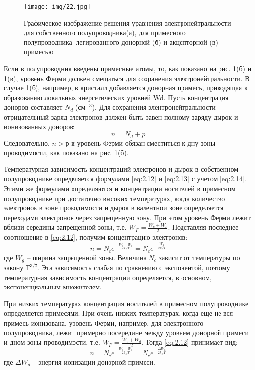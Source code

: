 \begin{figure}[h!]
	\texttt{[image: img/22.jpg]}
	\caption{Графическое изображение решения уравнения электронейтральности для собственного полупроводника(а), для примесного полупроводника, легированного донорной (б) и акцепторной (в) примесью}
	\label{fig:2.1}
\end{figure}

Если в полупроводник введены примесные атомы, то, как показано на рис. \ref{fig:2.1}(б) и \ref{fig:2.1}(в), уровень Ферми должен смещаться для
сохранения электронейтральности. В случае \ref{fig:2.1}(б), например, в кристалл добавляется донорная примесь, приводящая к
образованию локальных энергетических уровней Wd. Пусть концентрация доноров составляет $N_d$ (см$^{-3}$). Для сохранения
элентронейтральности отрицательный заряд электронов должен быть равен полному заряду дырок и ионизованных доноров:
\begin{equation}
	n = N_d+p
	\label{eq:2.15}
\end{equation}
Следовательно, $n>р$ и уровень Ферми обязан сместиться к дну зоны проводимости, как показано на рис. \ref{fig:2.1}(б).

Температурная зависимость концентраций электронов и дырок в собственном полупроводнике определяется формулами \eqref{eq:2.12} и \eqref{eq:2.13} с учетом
\eqref{eq:2.14}. Этими же формулами определяются и концентрации носителей в примесном полупроводнике при достаточно высоких
температурах, когда количество электронов в зоне проводимости и дырок в валентной зоне определяется переходами
электронов через запрещенную зону. При этом уровень Ферми лежит вблизи середины запрещенной зоны, т.е. $W_F =
\frac{W_c+W_{\nu}}{2}$. Подставляя последнее соотношение в \eqref{eq:2.12}, получим концентрацию электронов:
\begin{equation}
	n=N_{c} e^{-\frac{W_{c}-W_{v}}{2 k_{B} T}}=N_{c} e^{-\frac{W_{g}}{2 k_{B} T}}
	\label{eq:2.16}
\end{equation}
где $W_g$  – ширина запрещенной зоны. Величина $N_c$ зависит от температуры по закону $Т^{3/2}$. Эта зависимость слабая по
сравнению с экспонентой, поэтому температурная зависимость концентрации определяется, в основном, экспоненциальным
множителем. 

При низких температурах концентрация носителей в примесном полупроводнике определяется примесями. При очень низких
температурах, когда еще не вся примесь ионизована, уровень Ферми, например, для электронного полупроводника, лежит
примерно посередине между уровнем донорной примеси и дном зоны проводимости, т.е. $W_F = \frac{W_c+W_{d}}{2}$. Тогда \eqref{eq:2.12}
принимает вид: 
\begin{equation}
	n=N_{c} e^{-\frac{W_{c}-W_{d}}{2 k_{B} T}}=N_{c} e^{-\frac{\Delta W_{d}}{2 k_{B} T}}
	\label{eq:2.17}
\end{equation}
где $\Delta W_d$ – энергия ионизации донорной примеси. 

